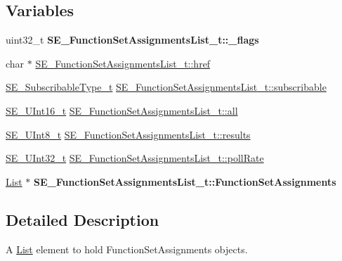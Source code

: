 \subsection*{Variables}
\begin{DoxyCompactItemize}
\item 
\mbox{\label{group__FunctionSetAssignmentsList_gad6d901e095653dbd48b331f675547e0a}} 
uint32\+\_\+t {\bfseries S\+E\+\_\+\+Function\+Set\+Assignments\+List\+\_\+t\+::\+\_\+flags}
\item 
char $\ast$ \hyperlink{group__FunctionSetAssignmentsList_ga68247d187c62acc81cce9a7d85ad209b}{S\+E\+\_\+\+Function\+Set\+Assignments\+List\+\_\+t\+::href}
\item 
\hyperlink{group__SubscribableType_ga5c41f553d369710ed34619266bf2551e}{S\+E\+\_\+\+Subscribable\+Type\+\_\+t} \hyperlink{group__FunctionSetAssignmentsList_ga52f70232590c8b6c1b9d368bffbfa680}{S\+E\+\_\+\+Function\+Set\+Assignments\+List\+\_\+t\+::subscribable}
\item 
\hyperlink{group__UInt16_gac68d541f189538bfd30cfaa712d20d29}{S\+E\+\_\+\+U\+Int16\+\_\+t} \hyperlink{group__FunctionSetAssignmentsList_gaa3cb8c5a55ac18b63bd2582417f168e0}{S\+E\+\_\+\+Function\+Set\+Assignments\+List\+\_\+t\+::all}
\item 
\hyperlink{group__UInt8_gaf7c365a1acfe204e3a67c16ed44572f5}{S\+E\+\_\+\+U\+Int8\+\_\+t} \hyperlink{group__FunctionSetAssignmentsList_ga38dcb9244c2fd218072dcfa083d510d8}{S\+E\+\_\+\+Function\+Set\+Assignments\+List\+\_\+t\+::results}
\item 
\hyperlink{group__UInt32_ga70bd4ecda3c0c85d20779d685a270cdb}{S\+E\+\_\+\+U\+Int32\+\_\+t} \hyperlink{group__FunctionSetAssignmentsList_gab2f324d046132de9d38914b6d93d2155}{S\+E\+\_\+\+Function\+Set\+Assignments\+List\+\_\+t\+::poll\+Rate}
\item 
\mbox{\label{group__FunctionSetAssignmentsList_gabad09e3d889b620f756e6ceb124c8cfd}} 
\hyperlink{structList}{List} $\ast$ {\bfseries S\+E\+\_\+\+Function\+Set\+Assignments\+List\+\_\+t\+::\+Function\+Set\+Assignments}
\end{DoxyCompactItemize}


\subsection{Detailed Description}
A \hyperlink{structList}{List} element to hold Function\+Set\+Assignments objects. 

